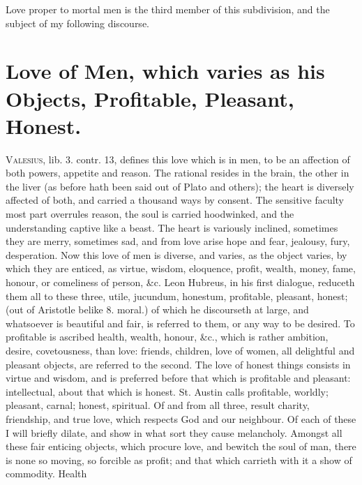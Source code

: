 {Love proper to mortal men is the third member of this subdivision, and
the subject of my following discourse.


\section[Love of Men]{Love of Men, which varies as his Objects, Profitable, Pleasant, Honest.}

\lettrine{V}{alesius}, lib. 3. contr. 13, defines this love which is in men, to be
an affection of both powers, appetite and reason. The rational
resides in the brain, the other in the liver (as before hath been said
out of Plato and others); the heart is diversely affected of both, and
carried a thousand ways by consent. The sensitive faculty most part
overrules reason, the soul is carried hoodwinked, and the understanding
captive like a beast. The heart is variously inclined, sometimes
they are merry, sometimes sad, and from love arise hope and fear,
jealousy, fury, desperation. Now this love of men is diverse, and
varies, as the object varies, by which they are enticed, as virtue,
wisdom, eloquence, profit, wealth, money, fame, honour, or comeliness
of person, \&c. Leon Hubreus, in his first dialogue, reduceth them all
to these three, utile, jucundum, honestum, profitable, pleasant,
honest; (out of Aristotle belike 8. moral.) of which he discourseth at
large, and whatsoever is beautiful and fair, is referred to them, or
any way to be desired. To profitable is ascribed health, wealth,
honour, \&c., which is rather ambition, desire, covetousness, than love:
friends, children, love of women, all delightful and pleasant
objects, are referred to the second. The love of honest things consists
in virtue and wisdom, and is preferred before that which is profitable
and pleasant: intellectual, about that which is honest. St.
Austin calls profitable, worldly; pleasant, carnal; honest, spiritual.
Of and from all three, result charity, friendship, and true love,
which respects God and our neighbour. Of each of these I will briefly
dilate, and show in what sort they cause melancholy.
Amongst all these fair enticing objects, which procure love, and
bewitch the soul of man, there is none so moving, so forcible as
profit; and that which carrieth with it a show of commodity. Health
}
